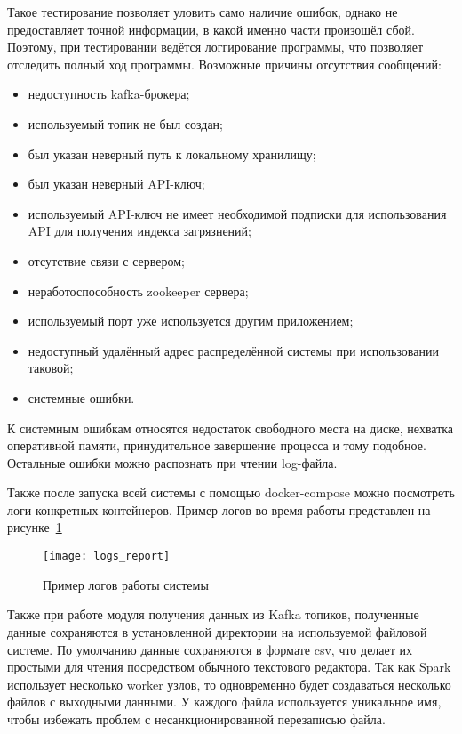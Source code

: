 Такое тестирование позволяет уловить само наличие ошибок, однако не предоставляет точной информации, в какой именно части произошёл сбой.
Поэтому, при тестировании ведётся логгирование программы, что позволяет отследить полный ход программы.
Возможные причины отсутствия сообщений:
\begin{itemize}
    \item недоступность kafka-брокера;
    \item используемый топик не был создан;
    \item был указан неверный путь к локальному хранилищу;
    \item был указан неверный API-ключ;
    \item используемый API-ключ не имеет необходимой подписки для использования API для получения индекса загрязнений;
    \item отсутствие связи с сервером;
    \item неработоспособность zookeeper сервера;
    \item используемый порт уже используется другим приложением;
    \item недоступный удалённый адрес распределённой системы при использовании таковой;
    \item системные ошибки.
\end{itemize}

К системным ошибкам относятся недостаток свободного места на диске, нехватка оперативной памяти, принудительное завершение процесса и тому подобное.
Остальные ошибки можно распознать при чтении log-файла.

Также после запуска всей системы с помощью docker-compose можно посмотреть логи конкретных контейнеров.
Пример логов во время работы представлен на рисунке~\ref{pic:lit_testing:logs_report}

\begin{figure}
    \centering
    \texttt{[image: logs\_report]}
    \caption{Пример логов работы системы}
    \label{pic:lit_testing:logs_report}
\end{figure}

Также при работе модуля получения данных из Kafka топиков, полученные данные сохраняются в установленной директории на используемой файловой системе.
По умолчанию данные сохраняются в формате csv, что делает их простыми для чтения посредством обычного текстового редактора.
Так как Spark использует несколько worker узлов, то одновременно будет создаваться несколько файлов с выходными данными.
У каждого файла используется уникальное имя, чтобы избежать проблем с несанкционированной перезаписью файла.

